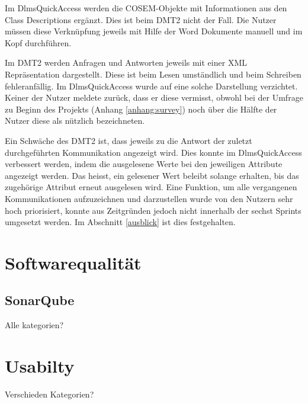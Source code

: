 Im DlmsQuickAccess werden die \ac{COSEM}-Objekte mit Informationen aus den Class Descriptions ergänzt.
Dies ist beim \ac{DMT2} nicht der Fall.
Die Nutzer müssen diese Verknüpfung jeweils mit Hilfe der Word Dokumente manuell und im Kopf durchführen.

Im \ac{DMT2} werden Anfragen und Antworten jeweils mit einer XML Repräsentation dargestellt.
Diese ist beim Lesen umständlich und beim Schreiben fehleranfällig.
Im DlmsQuickAccess wurde auf eine solche Darstellung verzichtet.
Keiner der Nutzer meldete zurück, dass er diese vermisst, obwohl bei der Umfrage zu Beginn des Projekts (Anhang \ref{anhang:survey}) noch über die Hälfte der Nutzer diese als nützlich bezeichneten.

Ein Schwäche des \ac{DMT2} ist, dass jeweils zu die Antwort der zuletzt durchgeführten Kommunikation angezeigt wird.
Dies konnte im DlmsQuickAccess verbessert werden, indem die ausgelesene Werte bei den jeweiligen Attribute angezeigt werden.
Das heisst, ein gelesener Wert beleibt solange erhalten, bis das zugehörige Attribut erneut ausgelesen wird.
Eine Funktion, um alle vergangenen Kommunikationen aufzuzeichnen und darzustellen wurde von den Nutzern sehr hoch priorisiert, konnte aus Zeitgründen jedoch nicht innerhalb der sechst Sprints umgesetzt werden.
Im Abschnitt \ref{ausblick} ist dies festgehalten.



\section{Softwarequalität}\label{evalQuality}

\subsection{SonarQube}
Alle kategorien?

\section{Usabilty}
Verschieden Kategorien?